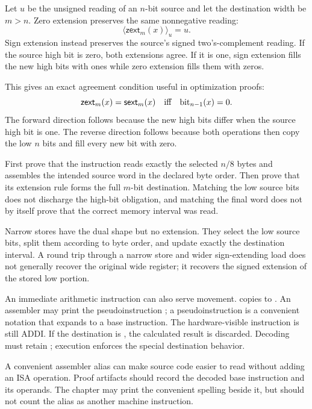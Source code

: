 Let \(u\) be the unsigned reading of an \(n\)-bit source and let the
destination width be \(m>n\). Zero extension preserves the same nonnegative
reading:
\[
  \langle\mathsf{zext}_{m}(x)\rangle_u=u.
\]
Sign extension instead preserves the source's signed two's-complement reading.
If the source high bit is zero, both extensions agree. If it is one, sign
extension fills the new high bits with ones while zero extension fills them
with zeros.

This gives an exact agreement condition useful in optimization proofs:
\[
  \mathsf{zext}_{m}(x)=\mathsf{sext}_{m}(x)
  \quad\hbox{iff}\quad \mathrm{bit}_{n-1}(x)=0.
\]
The forward direction follows because the new high bits differ when the source
high bit is one. The reverse direction follows because both operations then
copy the low \(n\) bits and fill every new bit with zero.

\begin{proofkit}[title={A narrow load has two independent obligations}]
First prove that the instruction reads exactly the selected \(n/8\) bytes and
assembles the intended source word in the declared byte order. Then prove that
its extension rule forms the full \(m\)-bit destination. Matching the low
source bits does not discharge the high-bit obligation, and matching the final
word does not by itself prove that the correct memory interval was read.
\end{proofkit}

Narrow stores have the dual shape but no extension. They select the low source
bits, split them according to byte order, and update exactly the destination
interval. A round trip through a narrow store and wider sign-extending load
does not generally recover the original wide register; it recovers the signed
extension of the stored low portion.

An immediate arithmetic instruction can also serve movement. 
copies  to . An assembler may print the pseudoinstruction
; a pseudoinstruction is a convenient notation that expands to
a base instruction. The hardware-visible instruction is still ADDI. If
the destination is , the calculated result is discarded. Decoding must
retain ; execution enforces the special destination behavior.

\begin{sidebar}[title={Pseudoinstructions belong to the notation layer}]
A convenient assembler alias can make source code easier to read without adding
an ISA operation. Proof artifacts should record the decoded base instruction and its
operands. The chapter may print the convenient spelling beside it, but should
not count the alias as another machine instruction.
\end{sidebar}

